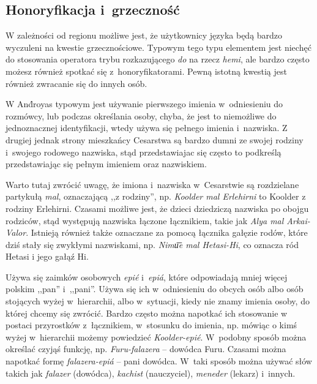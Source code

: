 \begin{spacing}{1.1}

\subsection{Honoryfikacja i~grzeczność}

W zależności od regionu możliwe jest, że użytkownicy języka będą bardzo
wyczuleni na kwestie grzecznościowe. Typowym tego typu elementem jest niechęć
do stosowania operatora trybu rozkazującego \emph{do} na rzecz \emph{hemi},
ale bardzo często możesz również spotkać się z~honoryfikatorami. Pewną istotną
kwestią jest również zwracanie się do innych osób.

W And́royas typowym jest używanie pierwszego imienia w~odniesieniu do rozmówcy,
lub podczas określania osoby, chyba, że jest to niemożliwe do jednoznacznej 
identyfikacji, wtedy używa się pełnego imienia i~nazwiska. Z drugiej jednak strony
mieszkańcy Cesarstwa są bardzo dumni ze swojej rodziny i~swojego rodowego nazwiska, 
stąd przedstawiajac się często to podkreślą przedstawiając się pełnym imieniem
oraz nazwiskiem.


Warto tutaj zwrócić uwagę, że imiona i~nazwiska w~Cesarstwie są rozdzielane 
partykułą \emph{mal}, oznaczającą ,,z rodziny'', np. \emph{Koolder mal Erlehirni}
to Koolder z rodziny Erlehirni. Czasami możliwe jest, że dzieci dziedziczą 
nazwiska po obojgu rodziców, stąd występują nazwiska łączone łącznikiem, takie 
jak \emph{Alya mal Arkai-Valor}. Istnieją również także oznaczane za pomocą 
łącznika gałęzie rodów, które dziś stały się zwykłymi nazwiskami, np. 
\emph{Nimu͞e mal Hetasi-Hi}, co oznacza ród Hetasi i jego gałąź Hi.

\skipline

Używa się zaimków osobowych \emph{epié} i~\emph{epiá}, które odpowiadają mniej
więcej polskim ,,pan'' i~,,pani''. Używa się ich w~odniesieniu do obcych osób albo
osób stojących wyżej w~hierarchii, albo w~sytuacji, kiedy nie znamy imienia 
osoby, do której chcemy się zwrócić. Bardzo często można napotkać ich stosowanie
w postaci przyrostków z~łącznikiem, w~stosunku do imienia, np. mówiąc o kimś
wyżej w~hierarchii możemy powiedzieć \emph{Koolder-epié}. W~podobny sposób
można określać czyjąś funkcję, np. \emph{Furu-falazera} -- dowódca Furu. Czasami
można napotkać formę \emph{falazera-epiá} -- pani dowódca. W~taki sposób można
używać słów takich jak \emph{falazer} (dowódca), \emph{kachist} (nauczyciel), 
\emph{meneder} (lekarz) i~innych.


\end{spacing}
